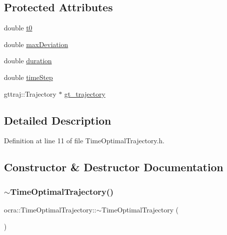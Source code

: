 \subsection*{Protected Attributes}
\begin{DoxyCompactItemize}
\item 
double \hyperlink{classocra_1_1TimeOptimalTrajectory_a7c58d1493c4227bb5d209de36ade154e}{t0}
\item 
double \hyperlink{classocra_1_1TimeOptimalTrajectory_a7709c9a5e8ab5e48657cc965f59d0f57}{max\+Deviation}
\item 
double \hyperlink{classocra_1_1TimeOptimalTrajectory_a6c6b5ffec595af24fd0061d47f85ebdf}{duration}
\item 
double \hyperlink{classocra_1_1TimeOptimalTrajectory_aacee4e110122959c3f47c07a9b7796bf}{time\+Step}
\item 
gttraj\+::\+Trajectory $\ast$ \hyperlink{classocra_1_1TimeOptimalTrajectory_a350a0c047e3f65fc7dd55d6b5dfa5796}{gt\+\_\+trajectory}
\end{DoxyCompactItemize}


\subsection{Detailed Description}


Definition at line 11 of file Time\+Optimal\+Trajectory.\+h.



\subsection{Constructor \& Destructor Documentation}
\hypertarget{classocra_1_1TimeOptimalTrajectory_a4f4e9ce2cd5b313d8418893d89b5cc8f}{}\label{classocra_1_1TimeOptimalTrajectory_a4f4e9ce2cd5b313d8418893d89b5cc8f} 
\subsubsection{\texorpdfstring{$\sim$\+Time\+Optimal\+Trajectory()}{~TimeOptimalTrajectory()}}
{\footnotesize\ttfamily ocra\+::\+Time\+Optimal\+Trajectory\+::$\sim$\+Time\+Optimal\+Trajectory (\begin{DoxyParamCaption}{ }\end{DoxyParamCaption})\hspace{0.3cm}{\ttfamily [virtual]}}



